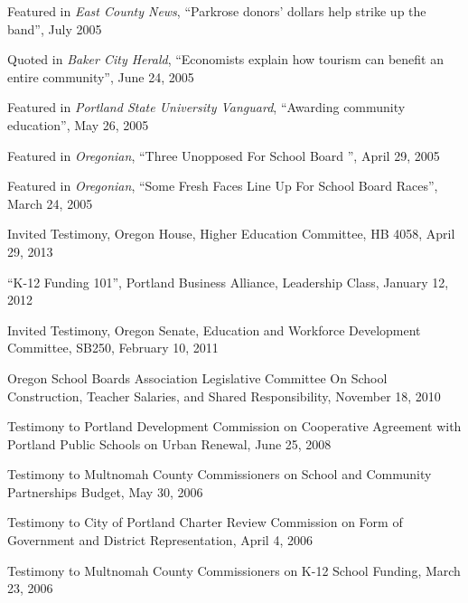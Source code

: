 \documentclass[Computer Science]{vita}
\begin{document}
\begin{vita}
\begin{Media Outreach}
  \item Featured in \emph{East County News}, ``Parkrose donors'
    dollars help strike up the band'', July 2005

  \item Quoted in \emph{Baker City Herald}, ``Economists explain how
    tourism can benefit an entire community'', June 24, 2005
	
  \item Featured in \emph{Portland State University Vanguard},
    ``Awarding community education'', May 26, 2005
	
  \item Featured in \emph{Oregonian}, ``Three Unopposed For School
    Board '', April 29, 2005
	
  \item Featured in \emph{Oregonian}, ``Some Fresh Faces Line Up For
    School Board Races'', March 24, 2005

  \end{Media Outreach}

  \begin{Community Outreach}
  
  \item Invited Testimony, Oregon House, Higher Education Committee, HB 4058, April 29, 2013

\item ``K-12 Funding 101'', Portland Business Alliance, Leadership Class, January 12, 2012

\item Invited Testimony, Oregon Senate, Education and Workforce Development Committee, SB250, February 10, 2011 
  
\item Oregon School Boards Association Legislative Committee On School Construction, Teacher Salaries, and Shared Responsibility, November 18, 2010   

  \item Testimony to Portland Development Commission on Cooperative
    Agreement with Portland Public Schools on Urban Renewal, June 25,
    2008

  \item Testimony to Multnomah County Commissioners on School and
    Community Partnerships Budget, May 30, 2006

  \item Testimony to City of Portland Charter Review Commission on
    Form of Government and District Representation, April 4, 2006

  \item Testimony to Multnomah County Commissioners on K-12 School
    Funding, March 23, 2006


\end{Community Outreach}
\end{vita}
\end{document}
